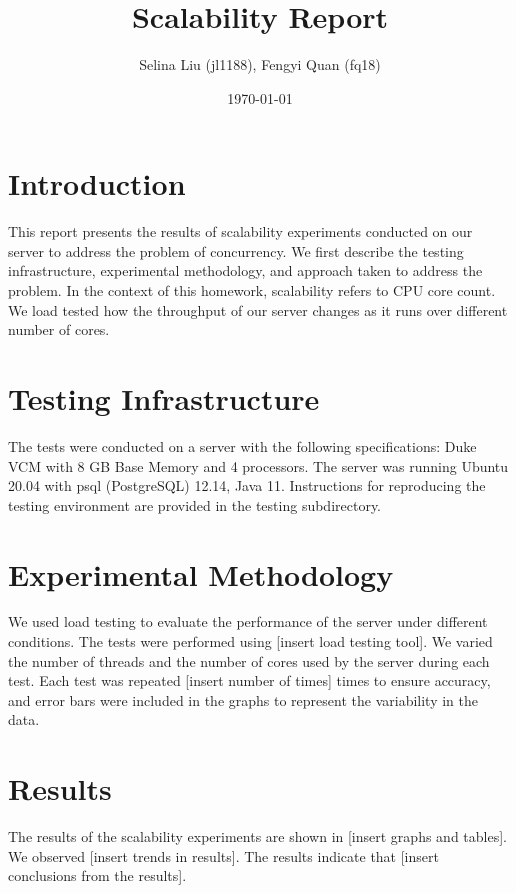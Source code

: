 \documentclass{article}
\begin{document}
\title{Scalability Report}
\author{Selina Liu (jl1188), Fengyi Quan (fq18)}
\date{\today}
\maketitle

\section{Introduction}
This report presents the results of scalability experiments conducted on our server to address the problem of concurrency. We first describe the testing infrastructure, experimental methodology, and approach taken to address the problem. In the context of this homework, scalability refers to CPU core count. We load tested how the throughput of our server changes as it runs over different number of cores. 

\section{Testing Infrastructure}
The tests were conducted on a server with the following specifications: Duke VCM with 8 GB Base Memory and 4 processors. The server was running Ubuntu 20.04 with psql (PostgreSQL) 12.14, Java 11. Instructions for reproducing the testing environment are provided in the testing subdirectory.

\section{Experimental Methodology}
We used load testing to evaluate the performance of the server under different conditions. The tests were performed using [insert load testing tool]. We varied the number of threads and the number of cores used by the server during each test. Each test was repeated [insert number of times] times to ensure accuracy, and error bars were included in the graphs to represent the variability in the data.

\section{Results}
The results of the scalability experiments are shown in [insert graphs and tables]. We observed [insert trends in results]. The results indicate that [insert conclusions from the results].

\end{document}
